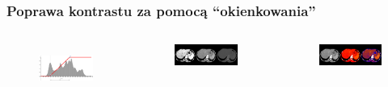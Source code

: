 \documentclass[aspectratio=169]{beamer}
\begin{document}
\begin{frame}[t]
    \frametitle{Poprawa kontrastu za pomocą \enquote{okienkowania}}
    \vspace{-1em}
    \begin{columns}[t]
        \vspace{-3.0em}
        \begin{figure}
            \href{https://www.geogebra.org/graphing/xpwanjem}{
                \includegraphics[width=1\textwidth]{img/windowing-chart2.png}
            }
        \end{figure}
        \vspace{-2.5em}
        \begin{figure}
            \includegraphics[trim={0 1cm 0 2cm},clip,width=1\textwidth]{img/monochrome-002.png}
        \end{figure}
        \vspace{-2.0em}
        \begin{figure}
            \includegraphics[trim={0 1cm 0 2cm},clip,width=1\textwidth]{img/monochrome-003.png}
        \end{figure}


\end{columns}
\end{frame}
\end{document}
